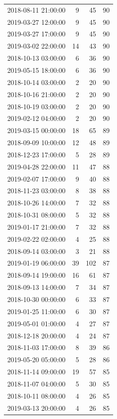 \begin{tabular}{lrrr}
2018-08-11 21:00:00 & 9 & 45 & 90 \\
2019-03-27 12:00:00 & 9 & 45 & 90 \\
2019-03-27 17:00:00 & 9 & 45 & 90 \\
2019-03-02 22:00:00 & 14 & 43 & 90 \\
2018-10-13 03:00:00 & 6 & 36 & 90 \\
2019-05-15 18:00:00 & 6 & 36 & 90 \\
2018-10-14 03:00:00 & 2 & 20 & 90 \\
2018-10-16 21:00:00 & 2 & 20 & 90 \\
2018-10-19 03:00:00 & 2 & 20 & 90 \\
2019-02-12 04:00:00 & 2 & 20 & 90 \\
2019-03-15 00:00:00 & 18 & 65 & 89 \\
2018-09-09 10:00:00 & 12 & 48 & 89 \\
2018-12-23 17:00:00 & 5 & 28 & 89 \\
2019-04-28 22:00:00 & 11 & 47 & 88 \\
2019-02-07 17:00:00 & 9 & 40 & 88 \\
2018-11-23 03:00:00 & 8 & 38 & 88 \\
2018-10-26 14:00:00 & 7 & 32 & 88 \\
2018-10-31 08:00:00 & 5 & 32 & 88 \\
2019-01-17 21:00:00 & 7 & 32 & 88 \\
2019-02-22 02:00:00 & 4 & 25 & 88 \\
2018-09-14 03:00:00 & 3 & 21 & 88 \\
2019-01-19 06:00:00 & 39 & 102 & 87 \\
2018-09-14 19:00:00 & 16 & 61 & 87 \\
2018-09-13 14:00:00 & 7 & 34 & 87 \\
2018-10-30 00:00:00 & 6 & 33 & 87 \\
2019-01-25 11:00:00 & 6 & 30 & 87 \\
2019-05-01 01:00:00 & 4 & 27 & 87 \\
2018-12-18 20:00:00 & 4 & 24 & 87 \\
2018-11-03 17:00:00 & 8 & 39 & 86 \\
2019-05-20 05:00:00 & 5 & 28 & 86 \\
2018-11-14 09:00:00 & 19 & 57 & 85 \\
2018-11-07 04:00:00 & 5 & 30 & 85 \\
2018-10-11 08:00:00 & 4 & 26 & 85 \\
2019-03-13 20:00:00 & 4 & 26 & 85 \\

\end{tabular}
